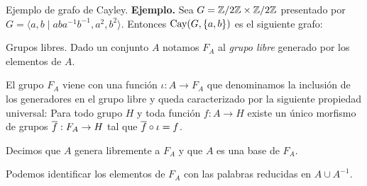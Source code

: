\documentclass[aspectratio=169, 10pt]{beamer}
\begin{document}
\begin{frame}[fragile]{Ejemplo de grafo de Cayley.}
	\textbf{Ejemplo.}
	Sea $G = \mathbb{Z}/2\mathbb{Z} \times \mathbb{Z}/2\mathbb{Z}$ presentado por $G = \langle a,b \mid aba^{-1}b^{-1}, a^{2}, b^{2}\rangle$.
	Entonces $\text{Cay}(G, \{a,b\})$ es el siguiente grafo: 
	
	\centering
		
\end{frame}

\begin{frame}[fragile]{Grupos libres.}
	Dado un conjunto $A$ notamos $F_{A}$ al \emph{grupo libre} generado por los elementos de $A$. 

	El grupo $F_{A}$ viene con una función $\iota: A \to F_{A}$ que denominamos la inclusión de los generadores en el grupo libre y queda caracterizado por la siguiente propiedad universal: 
	Para todo grupo $H$ y toda función $f:A \to H$ existe un único morfismo de grupos $\overline f: F_{A} \to H$ tal que $\overline f \circ \iota = f$.
	\begin{center}
	\end{center}

	Decimos que $A$ genera libremente a $F_{A}$ y que $A$ es una base de $F_{A}$.

	Podemos identificar los elementos de $F_{A}$ con las palabras reducidas en $A \cup A^{-1}$.
\end{frame}
\end{document}
